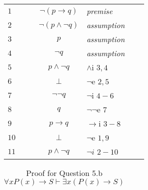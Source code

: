 \documentclass[a4paper,12pt]{article}
\begin{document}
\begin{tcolorbox}
\begin{table}[H]
\begin{tabular}{lllclll}
				$1$ & & & $\neg(p\rightarrow q)$ & \textit{premise} & & \\ \cline{2-7}
				
				$2$ &\multicolumn{1}{|c}{}& & $\neg(p\land\neg q)$ & \textit{assumption} & &\multicolumn{1}{l|}{}\\ 
				\cline{3-6}
				
				$3$ &\multicolumn{1}{|c}{}&\multicolumn{1}{|c}{}& $p$ & \textit{assumption} &\multicolumn{1}{l|}{}&\multicolumn{1}{l|}{}\\ \cline{4-5}
				
				$4$ &\multicolumn{1}{|c}{}&\multicolumn{1}{|c}{}&\multicolumn{1}{|c}{$\neg q$}&\multicolumn{1}{l|}{\textit{assumption}}&\multicolumn{1}{l|}{}&\multicolumn{1}{l|}{}\\
				
				$5$ &\multicolumn{1}{|c}{}&\multicolumn{1}{|c}{}&\multicolumn{1}{|c}{$p\land\neg q$}&\multicolumn{1}{l|}{$\land$i $3,4$}&\multicolumn{1}{l|}{}&\multicolumn{1}{l|}{}\\
				
				$6$ &\multicolumn{1}{|c}{}&\multicolumn{1}{|c}{}&\multicolumn{1}{|c}{$\bot$}&\multicolumn{1}{l|}{$\neg$e $2,5$}&\multicolumn{1}{l|}{}&\multicolumn{1}{l|}{}\\ \cline{4-5} 
				
				$7$ &\multicolumn{1}{|c}{}&\multicolumn{1}{|c}{}& $\neg\neg q$ & $\neg$i $4-6$ &\multicolumn{1}{l|}{}&\multicolumn{1}{l|}{}\\
				
				$8$ &\multicolumn{1}{|c}{}&\multicolumn{1}{|c}{}& $q$ & $\neg\neg$e $7$ &\multicolumn{1}{l|}{}&\multicolumn{1}{l|}{}\\ \cline{3-6}
				
				$9$ &\multicolumn{1}{|c}{}& & $p\rightarrow q$ & $\rightarrow$i $3-8$ & &\multicolumn{1}{l|}{}\\ 
				
				$10$ &\multicolumn{1}{|c}{}& & $\perp$ & $\neg$e $1,9$ & &\multicolumn{1}{l|}{}\\ \cline{2-7}
				
				$11$ & & & $p\land\neg q$ & $\neg i$ $2-10$ & & \\
				
			\end{tabular}
		\end{table}
		
		
		\begin{table}[H]
			\centering
			\caption{ Proof for Question 5.b $\forall x P(x) \rightarrow S \vdash \exists x (P(x)\rightarrow S)$ }
			\begin{tabular}{lllclll}
				\hline 
				\hline
				

\end{tabular}
\end{table}
\end{tcolorbox}
\end{document}
